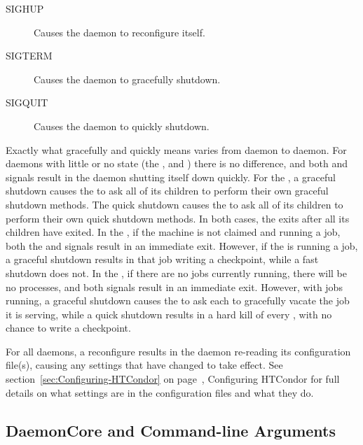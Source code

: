 \begin{description}
\item[SIGHUP] Causes the daemon to reconfigure itself.
\item[SIGTERM] Causes the daemon to gracefully shutdown.
\item[SIGQUIT] Causes the daemon to quickly shutdown.
\end{description}

Exactly what gracefully and quickly means varies from daemon
to daemon.  For daemons with little or no state 
(the ,  and )
there is no difference, and both  and  signals
result in the daemon shutting itself down quickly.
For the ,
a graceful shutdown causes the  to ask all of 
its children to perform their own graceful shutdown methods.
The quick shutdown causes the  to ask all of 
its children to perform their own quick shutdown methods.
In both cases, the  exits after all its children have exited.
In the , if the machine is not claimed and running a job, 
both the  and  signals result in an immediate exit.
However, if the  is running a job,
a graceful shutdown results in that job writing a checkpoint,
while a fast shutdown does not.
In the , if there are no jobs currently running,
there will be no  processes,
and both signals result in an immediate exit.
However, with jobs running, a graceful shutdown causes
the  to ask each  to gracefully vacate
the job it is serving, 
while a quick shutdown results in a hard kill of every ,
with no chance to write a checkpoint.  

For all daemons, a reconfigure results in the daemon re-reading
its configuration file(s), causing any settings that have changed
to take effect.
See section~\ref{sec:Configuring-HTCondor} on
page~\pageref{sec:Configuring-HTCondor}, Configuring HTCondor for full
details on what settings are in the configuration files and what they do.

\subsection{\label{sec:DaemonCore-Arguments}DaemonCore and
Command-line Arguments} 

